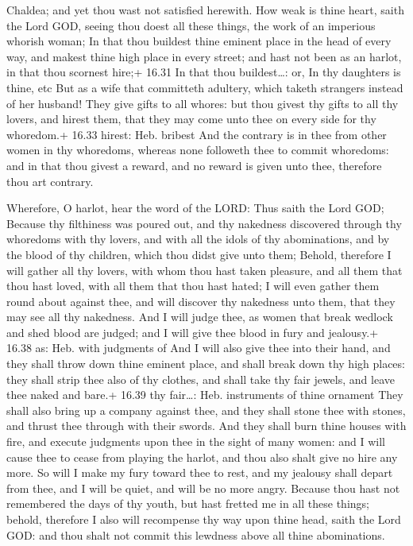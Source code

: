 Chaldea; and yet thou wast not satisfied herewith.  How
weak is thine heart, saith the Lord GOD, seeing thou doest all these
things, the work of an imperious whorish woman;  In that
thou buildest thine eminent place in the head of every way, and makest
thine high place in every street; and hast not been as an harlot, in
that thou scornest hire;+ 16.31 In that thou buildest\ldots: or, In thy
daughters is thine, etc  But as a wife that committeth
adultery, which taketh strangers instead of her husband! 
They give gifts to all whores: but thou givest thy gifts to all thy
lovers, and hirest them, that they may come unto thee on every side for
thy whoredom.+ 16.33 hirest: Heb. bribest  And the contrary
is in thee from other women in thy whoredoms, whereas none followeth
thee to commit whoredoms: and in that thou givest a reward, and no
reward is given unto thee, therefore thou art contrary.

 Wherefore, O harlot, hear the word of the LORD:
 Thus saith the Lord GOD; Because thy filthiness was poured
out, and thy nakedness discovered through thy whoredoms with thy lovers,
and with all the idols of thy abominations, and by the blood of thy
children, which thou didst give unto them;  Behold,
therefore I will gather all thy lovers, with whom thou hast taken
pleasure, and all them that thou hast loved, with all them that thou
hast hated; I will even gather them round about against thee, and will
discover thy nakedness unto them, that they may see all thy nakedness.
 And I will judge thee, as women that break wedlock and
shed blood are judged; and I will give thee blood in fury and jealousy.+
16.38 as: Heb. with judgments of  And I will also give thee
into their hand, and they shall throw down thine eminent place, and
shall break down thy high places: they shall strip thee also of thy
clothes, and shall take thy fair jewels, and leave thee naked and bare.+
16.39 thy fair\ldots: Heb. instruments of thine ornament 
They shall also bring up a company against thee, and they shall stone
thee with stones, and thrust thee through with their swords.
 And they shall burn thine houses with fire, and execute
judgments upon thee in the sight of many women: and I will cause thee to
cease from playing the harlot, and thou also shalt give no hire any
more.  So will I make my fury toward thee to rest, and my
jealousy shall depart from thee, and I will be quiet, and will be no
more angry.  Because thou hast not remembered the days of
thy youth, but hast fretted me in all these things; behold, therefore I
also will recompense thy way upon thine head, saith the Lord GOD: and
thou shalt not commit this lewdness above all thine abominations.

